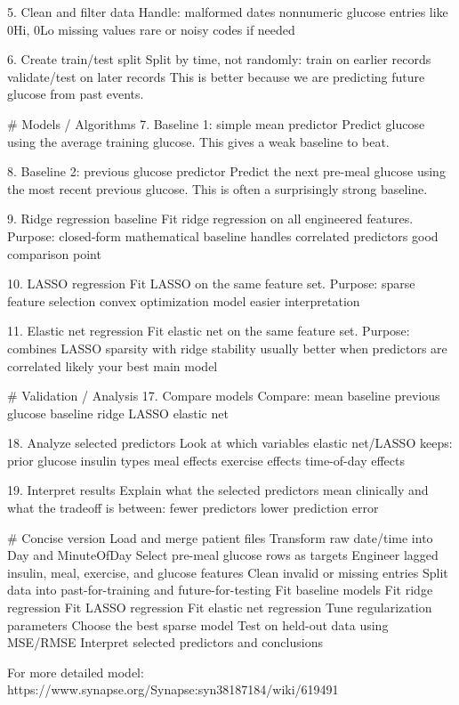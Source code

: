 5. Clean and filter data
Handle:
    malformed dates
    nonnumeric glucose entries like 0Hi, 0Lo
    missing values
    rare or noisy codes if needed

6. Create train/test split
Split by time, not randomly:
    train on earlier records
    validate/test on later records
    This is better because we are predicting future glucose from past events.

# Models / Algorithms
7. Baseline 1: simple mean predictor
    Predict glucose using the average training glucose.
    This gives a weak baseline to beat.

8. Baseline 2: previous glucose predictor
    Predict the next pre-meal glucose using the most recent previous glucose.
    This is often a surprisingly strong baseline.

9. Ridge regression baseline
Fit ridge regression on all engineered features.
Purpose:
    closed-form mathematical baseline
    handles correlated predictors
    good comparison point

10. LASSO regression
Fit LASSO on the same feature set.
Purpose:
    sparse feature selection
    convex optimization model
    easier interpretation

11. Elastic net regression
Fit elastic net on the same feature set.
Purpose:
    combines LASSO sparsity with ridge stability
    usually better when predictors are correlated
    likely your best main model


# Validation / Analysis
17. Compare models
Compare:
    mean baseline
    previous glucose baseline
    ridge
    LASSO
    elastic net

18. Analyze selected predictors
Look at which variables elastic net/LASSO keeps:
    prior glucose
    insulin types
    meal effects
    exercise effects
    time-of-day effects

19. Interpret results
Explain what the selected predictors mean clinically and what the tradeoff is between:
    fewer predictors
    lower prediction error


# Concise version
Load and merge patient files
Transform raw date/time into Day and MinuteOfDay
Select pre-meal glucose rows as targets
Engineer lagged insulin, meal, exercise, and glucose features
Clean invalid or missing entries
Split data into past-for-training and future-for-testing
Fit baseline models
Fit ridge regression
Fit LASSO regression
Fit elastic net regression
Tune regularization parameters
Choose the best sparse model
Test on held-out data using MSE/RMSE
Interpret selected predictors and conclusions


For more detailed model:
https://www.synapse.org/Synapse:syn38187184/wiki/619491